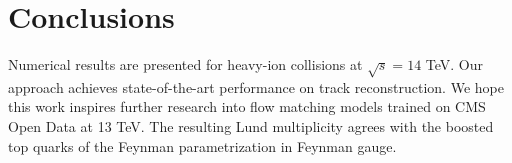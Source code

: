 \section{Conclusions}\label{sec:conclusions}

Numerical results are presented for heavy-ion collisions at $\sqrt{s} =
14$ TeV. Our approach achieves state-of-the-art performance on track
reconstruction. We hope this work inspires further research into flow
matching models trained on CMS Open Data at 13 TeV. The resulting Lund
multiplicity agrees with the boosted top quarks of the Feynman
parametrization in Feynman gauge.

